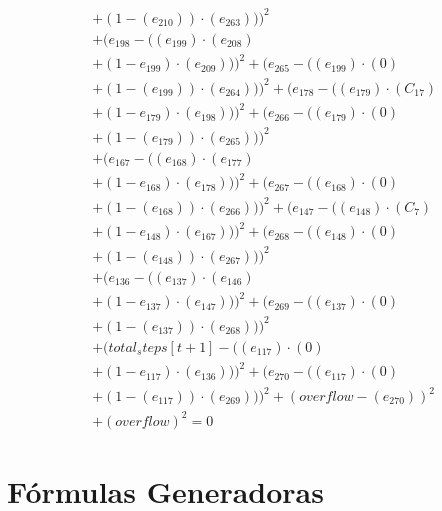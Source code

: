 \documentclass[10pt, a4paper]{article}
\begin{document}
\begin{align*}
& + (1 - (e_{210})) \cdot (e_{263})))^{2} \\
& + (e_{198} - ((e_{199})  \cdot  (e_{208}) \\
& + (1 - e_{199})  \cdot  (e_{209})))^{2} + (e_{265} - ((e_{199}) \cdot (0) \\
& + (1 - (e_{199})) \cdot (e_{264})))^{2} + (e_{178} - ((e_{179})  \cdot  (C_{17}) \\
& + (1 - e_{179})  \cdot  (e_{198})))^{2} + (e_{266} - ((e_{179}) \cdot (0) \\
& + (1 - (e_{179})) \cdot (e_{265})))^{2} \\
& + (e_{167} - ((e_{168})  \cdot  (e_{177}) \\
& + (1 - e_{168})  \cdot  (e_{178})))^{2} + (e_{267} - ((e_{168}) \cdot (0) \\
& + (1 - (e_{168})) \cdot (e_{266})))^{2} + (e_{147} - ((e_{148})  \cdot  (C_{7}) \\
& + (1 - e_{148})  \cdot  (e_{167})))^{2} + (e_{268} - ((e_{148}) \cdot (0) \\
& + (1 - (e_{148})) \cdot (e_{267})))^{2} \\
& + (e_{136} - ((e_{137})  \cdot  (e_{146}) \\
& + (1 - e_{137})  \cdot  (e_{147})))^{2} + (e_{269} - ((e_{137}) \cdot (0) \\
& + (1 - (e_{137})) \cdot (e_{268})))^{2} \\
& + (total_steps[t+1] - ((e_{117})  \cdot  (0) \\
& + (1 - e_{117})  \cdot  (e_{136})))^{2} + (e_{270} - ((e_{117}) \cdot (0) \\
& + (1 - (e_{117})) \cdot (e_{269})))^{2} + (overflow - (e_{270}))^{2} \\
& + (overflow)^{2} = 0
\end{align*}\part{Fórmulas Generadoras}
\end{document}
